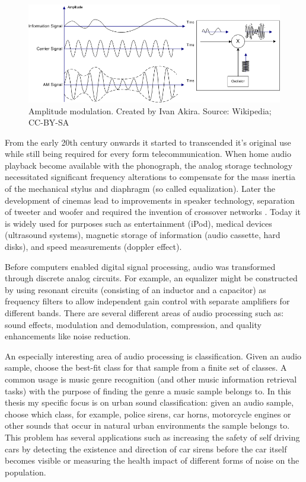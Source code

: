\begin{figure}[h]
    \centering
	\includegraphics[width=.95\textwidth]{./images/illustrations/am}
    \caption{Amplitude modulation. Created by Ivan Akira. Source: Wikipedia; CC-BY-SA}
    \label{fig:am}
\end{figure}

From the early 20th century onwards it started to transcended it's original use while still being required for every form telecommunication. When home audio playback become available with the phonograph, the analog storage technology necessitated significant frequency alterations to compensate for the mass inertia of the mechanical stylus and diaphragm (so called equalization)\cite{copeland2008manual}. Later the development of cinemas lead to improvements in speaker technology, separation of tweeter and woofer and required the invention of crossover networks \cite{spanias2006audio}.
Today it is widely used for purposes such as entertainment (iPod), medical devices (ultrasound systems), magnetic storage of information (audio cassette, hard disks), and speed measurements  (doppler effect).
 
 
Before computers enabled digital signal processing, audio was transformed through discrete analog circuits. For example, an equalizer might be constructed by using resonant circuits (consisting of an inductor and a capacitor) as frequency filters to allow independent gain control with separate amplifiers for different bands.
There are several different areas of audio processing such as: sound effects, modulation and demodulation, compression, and quality enhancements like noise reduction.

An especially interesting area of audio processing is classification. Given an audio sample, choose the best-fit class for that sample from a finite set of classes.  A common usage is music genre recognition (and other music information retrieval tasks) with the purpose of finding the genre a music sample belongs to. In this thesis my specific focus is on urban sound classification: given an audio sample, choose which class, for example, police sirens, car horns, motorcycle engines or other sounds that occur in natural urban environments the sample belongs to. This problem has several applications such as increasing the safety of self driving cars by detecting the existence and direction of car sirens before the car itself becomes visible or measuring the health impact of different forms of noise on the population.

